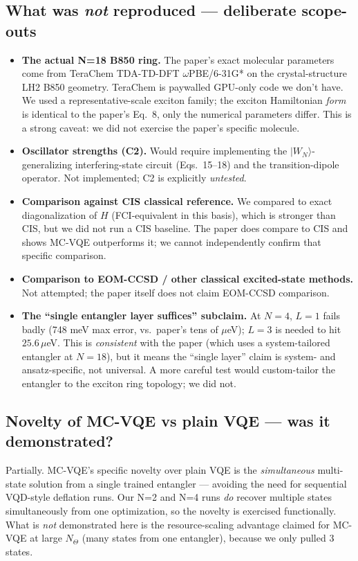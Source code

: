 \documentclass[11pt]{article}
\begin{document}
\subsection{What was \emph{not} reproduced --- deliberate scope-outs}
\begin{itemize}
\item \textbf{The actual N=18 B850 ring.} The paper's exact molecular parameters
      come from TeraChem TDA-TD-DFT $\omega$PBE/6-31G* on the crystal-structure
      LH2 B850 geometry. TeraChem is paywalled GPU-only code we don't have.
      We used a representative-scale exciton family; the exciton Hamiltonian
      \emph{form} is identical to the paper's Eq.~8, only the numerical
      parameters differ. This is a strong caveat: we did not exercise the
      paper's specific molecule.
\item \textbf{Oscillator strengths (C2).} Would require implementing the
      $|W_N\rangle$-generalizing interfering-state circuit (Eqs.~15--18) and
      the transition-dipole operator. Not implemented; C2 is explicitly
      \emph{untested}.
\item \textbf{Comparison against CIS classical reference.} We compared to exact
      diagonalization of $H$ (FCI-equivalent in this basis), which is stronger
      than CIS, but we did not run a CIS baseline. The paper does compare to
      CIS and shows MC-VQE outperforms it; we cannot independently confirm
      that specific comparison.
\item \textbf{Comparison to EOM-CCSD / other classical excited-state methods.}
      Not attempted; the paper itself does not claim EOM-CCSD comparison.
\item \textbf{The ``single entangler layer suffices'' subclaim.} At $N=4$,
      $L=1$ fails badly (748 meV max error, vs.\ paper's tens of $\mu$eV);
      $L=3$ is needed to hit $25.6\,\mu$eV. This is \emph{consistent} with the
      paper (which uses a system-tailored entangler at $N=18$), but it means
      the ``single layer'' claim is system- and ansatz-specific, not universal.
      A more careful test would custom-tailor the entangler to the exciton
      ring topology; we did not.
\end{itemize}

\subsection{Novelty of MC-VQE vs plain VQE --- was it demonstrated?}
Partially. MC-VQE's specific novelty over plain VQE is the \emph{simultaneous}
multi-state solution from a single trained entangler --- avoiding the need for
sequential VQD-style deflation runs. Our N=2 and N=4 runs \emph{do} recover
multiple states simultaneously from one optimization, so the novelty is
exercised functionally. What is \emph{not} demonstrated here is the
resource-scaling advantage claimed for MC-VQE at large $N_\Theta$ (many states
from one entangler), because we only pulled 3 states.
\end{document}
